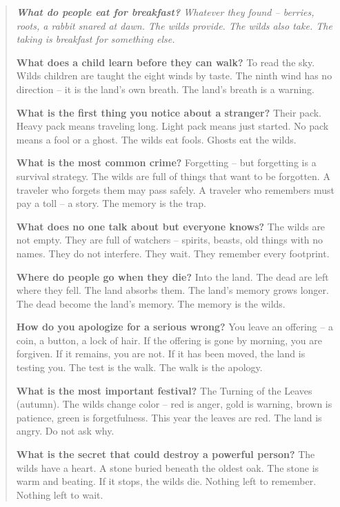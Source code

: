 \documentclass[12pt,oneside]{book}
\newenvironment{almanac}
  {\begin{quote}\small\itshape}
  {\end{quote}}
\begin{document}
\vspace{1em}
\begin{almanac}
\textbf{What do people eat for breakfast?} Whatever they found -- berries, roots, a rabbit snared at dawn. The wilds provide. The wilds also take. The taking is breakfast for something else.

\textbf{What does a child learn before they can walk?} To read the sky. Wilds children are taught the eight winds by taste. The ninth wind has no direction -- it is the land's own breath. The land's breath is a warning.

\textbf{What is the first thing you notice about a stranger?} Their pack. Heavy pack means traveling long. Light pack means just started. No pack means a fool or a ghost. The wilds eat fools. Ghosts eat the wilds.

\textbf{What is the most common crime?} Forgetting -- but forgetting is a survival strategy. The wilds are full of things that want to be forgotten. A traveler who forgets them may pass safely. A traveler who remembers must pay a toll -- a story. The memory is the trap.

\textbf{What does no one talk about but everyone knows?} The wilds are not empty. They are full of watchers -- spirits, beasts, old things with no names. They do not interfere. They wait. They remember every footprint.

\textbf{Where do people go when they die?} Into the land. The dead are left where they fell. The land absorbs them. The land's memory grows longer. The dead become the land's memory. The memory is the wilds.

\textbf{How do you apologize for a serious wrong?} You leave an offering -- a coin, a button, a lock of hair. If the offering is gone by morning, you are forgiven. If it remains, you are not. If it has been moved, the land is testing you. The test is the walk. The walk is the apology.

\textbf{What is the most important festival?} The Turning of the Leaves (autumn). The wilds change color -- red is anger, gold is warning, brown is patience, green is forgetfulness. This year the leaves are red. The land is angry. Do not ask why.

\textbf{What is the secret that could destroy a powerful person?} The wilds have a heart. A stone buried beneath the oldest oak. The stone is warm and beating. If it stops, the wilds die. Nothing left to remember. Nothing left to wait.
\end{almanac}
\end{document}
